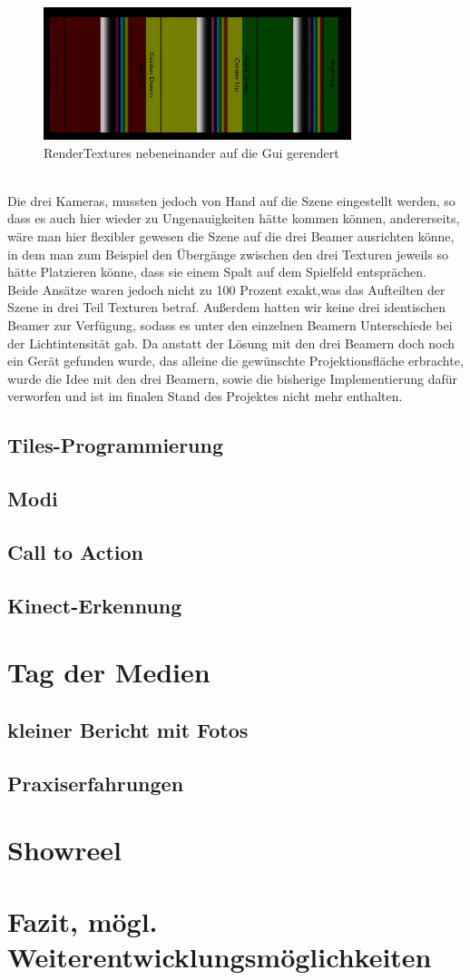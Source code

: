 \begin{figure}[h]
	\centering
		\includegraphics[width=0.8\textwidth]{images/RenderTexturesAlsGui.PNG}
	\caption{RenderTextures nebeneinander auf die Gui gerendert}
	\label{fig:RenderTexturesAlsGui}
\end{figure}\\
Die drei Kameras, mussten jedoch von Hand auf die Szene eingestellt werden, so dass es auch hier wieder zu Ungenauigkeiten hätte kommen können, andererseits, wäre man hier flexibler gewesen die Szene auf die drei Beamer ausrichten könne, in dem man zum Beispiel den Übergänge zwischen den drei Texturen jeweils so hätte Platzieren könne, dass sie einem Spalt auf dem Spielfeld entsprächen.\\ 
Beide Ansätze waren jedoch nicht zu 100 Prozent exakt,was das Aufteilten der Szene in drei Teil Texturen betraf. Außerdem hatten wir keine drei identischen Beamer zur Verfügung, sodass es unter den einzelnen Beamern Unterschiede bei der Lichtintensität gab.
Da anstatt der Lösung mit den drei Beamern doch noch ein Gerät gefunden wurde, das alleine die gewünschte Projektionsfläche erbrachte, wurde die Idee mit den drei Beamern, sowie die bisherige Implementierung dafür verworfen und ist im finalen Stand des Projektes nicht mehr enthalten.\\
\newpage
\subsection{Tiles-Programmierung}
\subsection{Modi}
\subsection{Call to Action}
\subsection{Kinect-Erkennung}


\section{Tag der Medien}
\subsection{kleiner Bericht mit Fotos}
\subsection{Praxiserfahrungen}

\section{Showreel}
\section{Fazit, mögl. Weiterentwicklungsmöglichkeiten}

